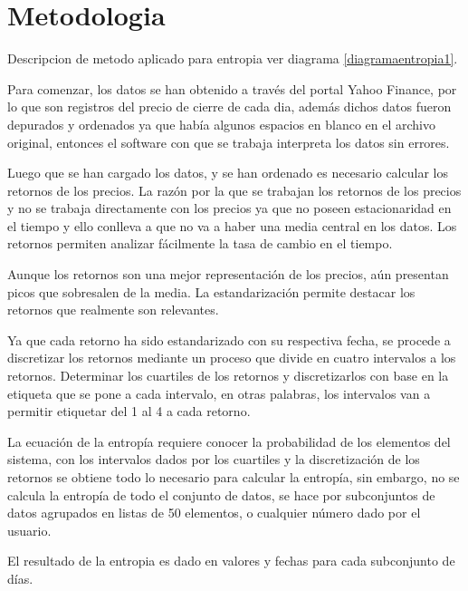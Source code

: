%
\chapter{Metodologia}
\label{Metodologia}

Descripcion de metodo aplicado para entropia  ver diagrama \ref{diagramaentropia1}.

Para comenzar, los datos se han obtenido a través del portal Yahoo Finance, por lo que son registros del precio de cierre de cada dia, además dichos datos fueron depurados y ordenados ya que había algunos espacios en blanco en el archivo original, entonces el software con que se trabaja interpreta los datos sin errores. 

Luego que se han cargado los datos, y se han ordenado es necesario calcular los retornos de los precios. La razón por la que se trabajan los retornos de los precios y no se trabaja directamente con los precios ya que no poseen estacionaridad en el tiempo y ello conlleva a que no va a haber una media central en los datos. Los retornos permiten analizar fácilmente la tasa de cambio en el tiempo. 

Aunque los retornos son una mejor representación de los precios, aún presentan picos que sobresalen de la media. La estandarización permite destacar los retornos que realmente son relevantes. 

Ya que cada retorno ha sido estandarizado con su respectiva fecha,  se procede a discretizar los retornos mediante un proceso que divide en cuatro intervalos a los retornos. Determinar los cuartiles de los retornos y discretizarlos con base en la etiqueta que se pone a cada intervalo, en otras palabras, los intervalos van a permitir etiquetar del 1 al 4 a cada retorno. 

La ecuación de la entropía requiere conocer la probabilidad de los elementos del sistema, con los intervalos dados por los cuartiles y la discretización de los retornos se obtiene todo lo necesario para calcular la entropía, sin embargo, no se calcula la entropía de todo el conjunto de datos, se hace por subconjuntos de datos agrupados en listas de 50 elementos, o cualquier número dado por el usuario.

El resultado de la entropia es dado en valores y fechas para cada subconjunto de días.

